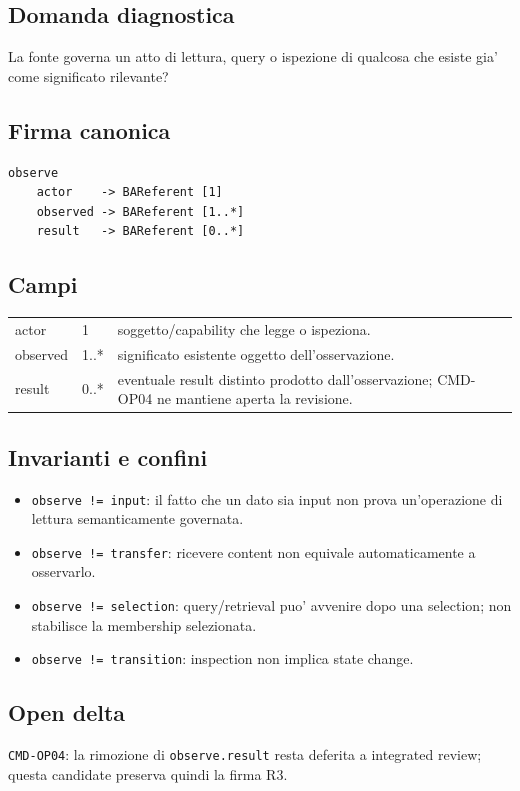 \documentclass[11pt,a4paper]{article}
\begin{document}
\subsection{Domanda diagnostica}
La fonte governa un atto di lettura, query o ispezione di qualcosa che esiste gia' come significato rilevante?

\subsection{Firma canonica}
\begin{lstlisting}
observe
    actor    -> BAReferent [1]
    observed -> BAReferent [1..*]
    result   -> BAReferent [0..*]
\end{lstlisting}

\subsection{Campi}
\begin{tabularx}{\textwidth}{L{36mm}L{24mm}Y}
\toprule
actor & 1 & soggetto/capability che legge o ispeziona. \\
observed & 1..* & significato esistente oggetto dell'osservazione. \\
result & 0..* & eventuale result distinto prodotto dall'osservazione; CMD-OP04 ne mantiene aperta la revisione. \\
\bottomrule
\end{tabularx}

\subsection{Invarianti e confini}
\begin{itemize}
  \item \texttt{observe != input}: il fatto che un dato sia input non prova un'operazione di lettura semanticamente governata.
  \item \texttt{observe != transfer}: ricevere content non equivale automaticamente a osservarlo.
  \item \texttt{observe != selection}: query/retrieval puo' avvenire dopo una selection; non stabilisce la membership selezionata.
  \item \texttt{observe != transition}: inspection non implica state change.
\end{itemize}

\subsection{Open delta}
\opentag\quad \texttt{CMD-OP04}: la rimozione di \texttt{observe.result} resta deferita a integrated review; questa candidate preserva quindi la firma R3.
\end{document}
